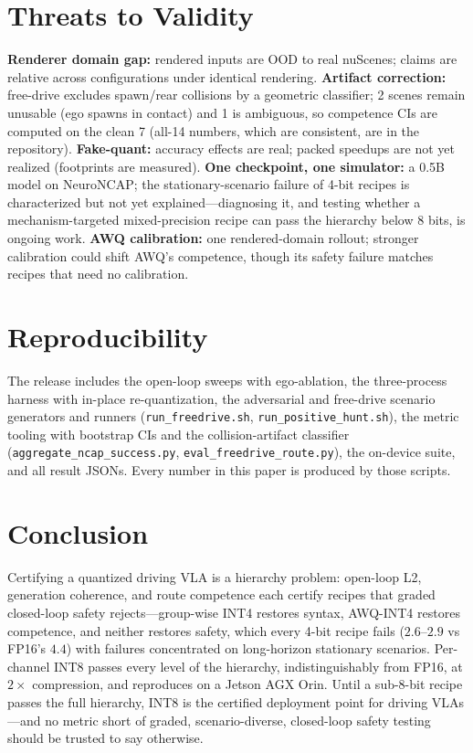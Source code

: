 \documentclass[conference]{IEEEtran}
\begin{document}
\section{Threats to Validity}
\label{sec:limits}
\textbf{Renderer domain gap:} rendered inputs are OOD to real nuScenes; claims are relative
across configurations under identical rendering. \textbf{Artifact correction:} free-drive
excludes spawn/rear collisions by a geometric classifier; 2 scenes remain unusable (ego
spawns in contact) and 1 is ambiguous, so competence CIs are computed on the clean 7 (all-14
numbers, which are consistent, are in the repository). \textbf{Fake-quant:} accuracy effects
are real; packed speedups are not yet realized (footprints are measured). \textbf{One
checkpoint, one simulator:} a 0.5B model on NeuroNCAP; the stationary-scenario failure of
4-bit recipes is characterized but not yet explained---diagnosing it, and testing whether a
mechanism-targeted mixed-precision recipe can pass the hierarchy below 8 bits, is ongoing
work. \textbf{AWQ calibration:} one rendered-domain rollout; stronger calibration could
shift AWQ's competence, though its safety failure matches recipes that need no calibration.

\section{Reproducibility}
The release includes the open-loop sweeps with ego-ablation, the three-process harness with
in-place re-quantization, the adversarial and free-drive scenario generators and runners
(\texttt{run\_freedrive.sh}, \texttt{run\_positive\_hunt.sh}), the metric tooling with
bootstrap CIs and the collision-artifact classifier
(\texttt{aggregate\_ncap\_success.py}, \texttt{eval\_freedrive\_route.py}), the on-device
suite, and all result JSONs. Every number in this paper is produced by those scripts.

\section{Conclusion}
Certifying a quantized driving VLA is a hierarchy problem: open-loop L2, generation
coherence, and route competence each certify recipes that graded closed-loop safety
rejects---group-wise INT4 restores syntax, AWQ-INT4 restores competence, and neither
restores safety, which every 4-bit recipe fails ($2.6$--$2.9$ vs FP16's $4.4$) with failures
concentrated on long-horizon stationary scenarios. Per-channel INT8 passes every level of
the hierarchy, indistinguishably from FP16, at $2\times$ compression, and reproduces on a
Jetson AGX Orin. Until a sub-8-bit recipe passes the full hierarchy, INT8 is the certified
deployment point for driving VLAs---and no metric short of graded, scenario-diverse,
closed-loop safety testing should be trusted to say otherwise.
\end{document}
